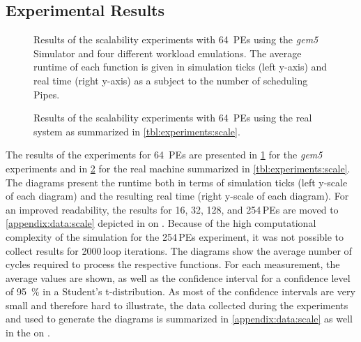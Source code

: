 \subsection{Experimental Results}%
\label{sec:studies:scale:results}

\begin{figure} \centering
	\caption[Results of the scalability experiments with 64~PEs and the gem5 Simulator.]{Results of the scalability experiments with 64~\acp{PE} using the \emph{gem5} Simulator and four different workload emulations. The average runtime of each function is given in simulation ticks (left y-axis) and real time (right y-axis) as a subject to the number of scheduling Pipes.}%
	\label{fig:eval:scale-gem5-64c}
\end{figure}

\begin{figure} \centering
	\caption[Results of the scalability experiments with 64~PEs and a real system.]{Results of the scalability experiments with 64~\acp{PE} using the real system as summarized in \cref{tbl:experiments:scale}.}%
	\label{fig:eval:scale-ftrace-64c}
\end{figure}

The results of the experiments for 64~\acp{PE} are presented in \cref{fig:eval:scale-gem5-64c} for the \emph{gem5} experiments and in \cref{fig:eval:scale-ftrace-64c} for the real machine summarized in \cref{tbl:experiments:scale}. The diagrams present the runtime both in terms of simulation ticks (left y-scale of each diagram) and the resulting real time (right y-scale of each diagram). For an improved readability, the results for \num{16}, \num{32}, \num{128}, and \num{254}\,\acp{PE} are moved to \cref{appendix:data:scale} depicted in  on . Because of the high computational complexity of the simulation for the \num{254}\,\acp{PE} experiment, it was not possible to collect results for \num{2000}\,loop iterations. The diagrams show the average number of cycles required to process the respective functions. For each measurement, the average values are shown, as well as the confidence interval for a confidence level of \SI{95}{\percent} in a Student's t-distribution. As most of the confidence intervals are very small and therefore hard to illustrate, the data collected during the experiments and used to generate the diagrams is summarized in \cref{appendix:data:scale} as well in the  on .

